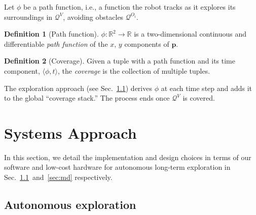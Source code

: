 \documentclass[letterpaper,10pt,conference,twoside]{IEEEtran}
\theoremstyle{definition}
\newtheorem{defn}{Definition}[section]
\begin{document}
Let $\phi$ be a path function, i.e., a function the robot tracks as it explores its surroundings in $\mathcal{Q}^V$, avoiding %
obstacles $\mathcal{Q}^{O_i}$.

\begin{defn}[Path function]\label{def:pf}
  $\phi:\mathbb{R}^2\rightarrow\mathbb{R}$ is a two-dimensional continuous and differentiable \textit{path function} of the $x$, $y$ components of $\mathbf{p}$.
\end{defn}

\begin{defn}[Coverage]\label{def:co}
  Given a tuple with a path function and its time component, $\langle\phi,t\rangle$, the \textit{coverage} is the collection of multiple tuples.
\end{defn}

The %
exploration approach %
(see Sec.~\ref{sec:le}) derives $\phi$ at each time step and adds it to the global ``coverage stack.'' The process ends once $\mathcal{Q}^V$ is covered.


\section{Systems Approach}
\label{sec:m}
\noindent
In this section, we detail the implementation and design choices in terms of %
our software and low-cost hardware for autonomous long-term %
exploration in Sec.~\ref{sec:le}~and~\ref{sec:md} respectively.

\subsection{Autonomous %
exploration}
\label{sec:le}
\end{document}
